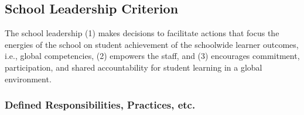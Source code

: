 \subsection{School Leadership Criterion}
The school leadership (1) makes decisions to facilitate actions that focus the energies of the school on student achievement of the schoolwide learner outcomes, i.e., global competencies, (2) empowers the staff, and (3) encourages commitment, participation, and shared accountability for student learning in a global environment.

\subsubsection{Defined Responsibilities, Practices, etc.}



